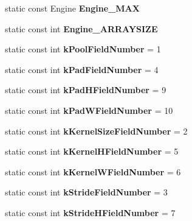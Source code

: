 \begin{DoxyCompactItemize}
\item 
static const Engine {\bfseries Engine\+\_\+\+M\+AX}
\item 
static const int {\bfseries Engine\+\_\+\+A\+R\+R\+A\+Y\+S\+I\+ZE}
\item 
\mbox{\label{classcaffe_1_1_pooling_parameter_a6b2540b17cf85d29f46b9a69b43c49f5}} 
static const int {\bfseries k\+Pool\+Field\+Number} = 1
\item 
\mbox{\label{classcaffe_1_1_pooling_parameter_a437407611f1e8eb9d6305b23fddfba57}} 
static const int {\bfseries k\+Pad\+Field\+Number} = 4
\item 
\mbox{\label{classcaffe_1_1_pooling_parameter_a1e6bbd40ac450b20a6feef3075115166}} 
static const int {\bfseries k\+Pad\+H\+Field\+Number} = 9
\item 
\mbox{\label{classcaffe_1_1_pooling_parameter_a001672f6f1f52c36ab2e61bd18fa92f4}} 
static const int {\bfseries k\+Pad\+W\+Field\+Number} = 10
\item 
\mbox{\label{classcaffe_1_1_pooling_parameter_a93574ff2018718ffdf680f423517c4cc}} 
static const int {\bfseries k\+Kernel\+Size\+Field\+Number} = 2
\item 
\mbox{\label{classcaffe_1_1_pooling_parameter_a2536ff3da300fae5b87d7ea4cebf080f}} 
static const int {\bfseries k\+Kernel\+H\+Field\+Number} = 5
\item 
\mbox{\label{classcaffe_1_1_pooling_parameter_a45fa26046a9131db5e9c0b4da938ec74}} 
static const int {\bfseries k\+Kernel\+W\+Field\+Number} = 6
\item 
\mbox{\label{classcaffe_1_1_pooling_parameter_aad6e7b1f6450221ab1bda800d1c6caa3}} 
static const int {\bfseries k\+Stride\+Field\+Number} = 3
\item 
\mbox{\label{classcaffe_1_1_pooling_parameter_a7f3bc65aacc4a73f540eac85912b3f07}} 
static const int {\bfseries k\+Stride\+H\+Field\+Number} = 7

\end{DoxyCompactItemize}
